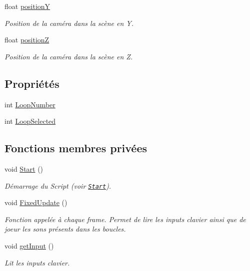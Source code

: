 \begin{DoxyCompactItemize}
float \hyperlink{class_music_a4d7d0c2af4148f072c1fb3ef94bbdc13}{position\+Y}
\begin{DoxyCompactList}\small\item\em Position de la caméra dans la scène en Y. \end{DoxyCompactList}\item 
float \hyperlink{class_music_a52ba6dc0dbd78bf134fdd6d7b6c563e9}{position\+Z}
\begin{DoxyCompactList}\small\item\em Position de la caméra dans la scène en Z. \end{DoxyCompactList}\end{DoxyCompactItemize}
\subsection*{Propriétés}
\begin{DoxyCompactItemize}
\item 
int \hyperlink{class_music_a68d031f187927ba922a6ee304a561c07}{Loop\+Number}
\item 
int \hyperlink{class_music_a08b2e446def0d17e713d4f723811b3be}{Loop\+Selected}
\end{DoxyCompactItemize}
\subsection*{Fonctions membres privées}
\begin{DoxyCompactItemize}
\item 
void \hyperlink{class_music_a88677b5b17d7881742cf8d0e23ac8207}{Start} ()
\begin{DoxyCompactList}\small\item\em Démarrage du Script (voir \href{http://docs.unity3d.com/ScriptReference/MonoBehaviour.Start.html}{\tt Start}). \end{DoxyCompactList}\item 
void \hyperlink{class_music_a57440cf9285a10dee627479fa0b7a3aa}{Fixed\+Update} ()
\begin{DoxyCompactList}\small\item\em Fonction appelée à chaque frame. Permet de lire les inputs clavier ainsi que de joeur les sons présents dans les boucles. \end{DoxyCompactList}\item 
void \hyperlink{class_music_a063497fdbf5be69712dc08866e0e2ea5}{get\+Input} ()
\begin{DoxyCompactList}\small\item\em Lit les inputs clavier. \end{DoxyCompactList}\end{DoxyCompactItemize}
